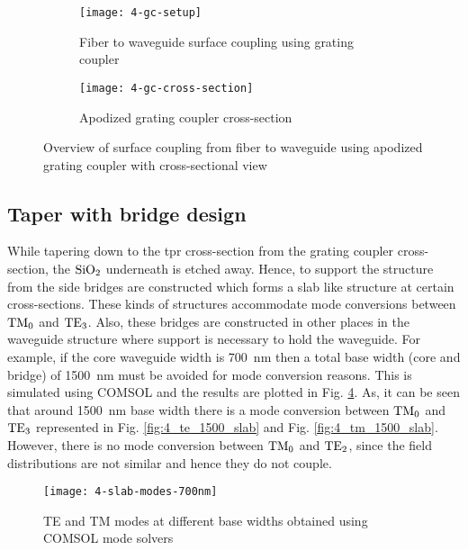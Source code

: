 \documentclass[../report.tex]{subfiles}
\begin{document}
\begin{figure}[H] %
	\begin{subfigure}[t]{0.45\textwidth}
		\texttt{[image: 4-gc-setup]}
		\caption{Fiber to waveguide surface coupling using grating coupler}
		\label{fig:4_gc_setup}
	\end{subfigure}
	\hfill
	\begin{subfigure}[t]{0.45\textwidth}
		\texttt{[image: 4-gc-cross-section]}
		\caption{Apodized grating coupler cross-section}
		\label{fig:4_gc_cross_section}
	\end{subfigure}
	\caption{Overview of surface coupling from fiber to waveguide using apodized grating coupler with cross-sectional view}
\end{figure}


\subsection{Taper with bridge design}
While tapering down to the \gls{tpr} cross-section from the grating coupler cross-section, the $\mathrm{SiO_{2}}$ underneath is etched away. Hence, to support the structure from the side bridges are constructed which forms a slab like structure at certain cross-sections. These kinds of structures accommodate mode conversions between $\mathrm{TM_0}$ and $\mathrm{TE_3}$. Also, these bridges are constructed in other places in the waveguide structure where support is necessary to hold the waveguide. For example, if the core waveguide width is \SI{700}{\nano\meter} then a total base width (core and bridge) of \SI{1500}{\nano\meter} must be avoided for mode conversion reasons. This is simulated using COMSOL and the results are plotted in Fig. \ref{fig:4_slab_modes_700nm}. As, it can be seen that around \SI{1500}{\nano\meter} base width there is a mode conversion between $\mathrm{TM_0}$ and $\mathrm{TE_3}$ represented in Fig. \ref{fig:4_te_1500_slab} and Fig. \ref{fig:4_tm_1500_slab}. However, there is no mode conversion between $\mathrm{TM_0}$ and $\mathrm{TE_2}$, since the field distributions are not similar and hence they do not couple.
 
 \begin{figure}[H] %
 	\centering
 	\texttt{[image: 4-slab-modes-700nm]}
 	\caption{TE and TM modes at different base widths obtained using COMSOL mode solvers}
 	\label{fig:4_slab_modes_700nm}
 \end{figure}
 
\end{document}
